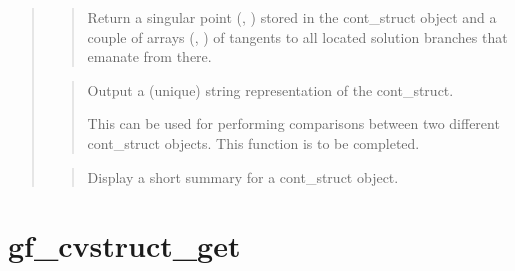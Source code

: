\documentclass[a4paper,11pt,english]{sphinxmanual}
\begin{document}
\begin{quote}
\begin{quote}

Return a singular point (, ) stored in the cont\_struct object and a
couple of arrays (, ) of tangents to all located solution
branches that emanate from there.
\end{quote}

\begin{quote}

Output a (unique) string representation of the cont\_struct.

This can be used for performing comparisons between two
different cont\_struct objects.
This function is to be completed.
\end{quote}

\begin{quote}

Display a short summary for a cont\_struct object.
\end{quote}
\end{quote}


\section{gf\_cvstruct\_get}
\label{\detokenize{matlab_octave/cmdref_gf_cvstruct_get:gf-cvstruct-get}}\label{\detokenize{matlab_octave/cmdref_gf_cvstruct_get::doc}}
\end{document}
